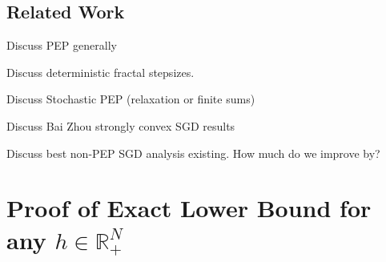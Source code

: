 \documentclass[11pt, hidelinks]{article}
\begin{document}
\subsection{Related Work} \label{sec:related}


Discuss PEP generally

Discuss deterministic fractal stepsizes.

Discuss Stochastic PEP (relaxation or finite sums)

Discuss Bai Zhou strongly convex SGD results


Discuss best non-PEP SGD analysis existing. How much do we improve by?



\section{Proof of Exact Lower Bound for any $h\in \mathbb{R}^N_+$} \label{sec:LB}
\end{document}
